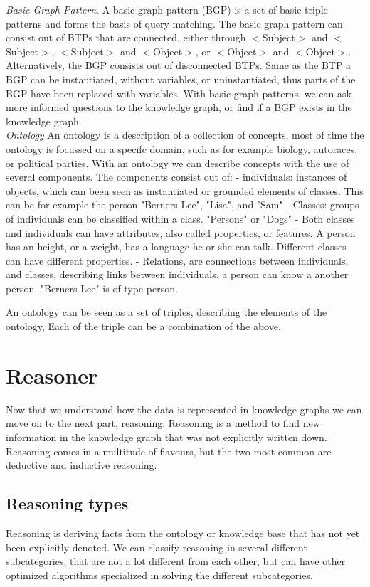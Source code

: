 \documentclass[11pt,letterpaper ,oneside ]{book}
\begin{document}
\textit{Basic Graph Pattern}. A basic graph pattern (BGP) is a set of basic triple patterns and forms the basis of query matching. The basic graph pattern
can consist out of BTPs that are connected, either through $<$Subject$>$ and $<$Subject$>$, $<$Subject$>$ and $<$Object$>$, or $<$Object$>$ and $<$Object$>$.
Alternatively, the BGP consists out of disconnected BTPs. Same as the BTP a BGP can be instantiated, without variables, or uninstantiated, thus parts of the BGP have been replaced with variables. With basic graph patterns, we can ask more informed questions to the knowledge graph, or find if a BGP exists in the knowledge graph.\\

\textit{Ontology} An ontology is a description of a collection of concepts, most of time the ontology is focussed on a specifc domain, such as for example biology, autoraces, or political parties. With an ontology we can describe concepts with the use of several components. The components consist out of:
- individuals: instances of objects, which can been seen as instantiated or grounded elements of classes. This can be for example the person "Berners-Lee", "Lisa", and "Sam"
- Classes: groups of individuals can be classified within a class. "Persons" or "Dogs"
- Both classes and individuals can have attributes, also called properties, or features. A person has an height, or a weight, has a language he or she can talk. Different classes can have different properties. 
- Relations, are connections between individuals, and classes, describing links between individuals. a person can know a another person. "Berners-Lee" is of type person. 

An ontology can be seen as a set of triples, describing the elements of the ontology, Each of the triple can be a combination of the above.

\section{Reasoner}
Now that we understand how the data is represented in knowledge graphs we can move on to the next part, reasoning. Reasoning is a method to find new information in the knowledge graph that was not explicitly written down. Reasoning comes in a multitude of flavours, but the two most common are deductive and inductive reasoning. 

\subsection{Reasoning types}
Reasoning is deriving facts from the ontology or knowledge base that has not yet been explicitly denoted. We can classify reasoning in several different subcategories, that are not a lot different from each other, but can have other optimized algorithms specialized in solving the different subcategories.
\end{document}

